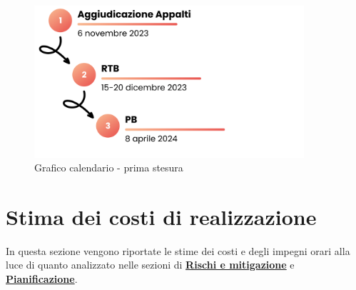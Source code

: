 \documentclass[10pt, a4paper]{article}
\begin{document}
{{{{{{ \begin{figure}[H]
        \centering
        \includegraphics[width=10cm]{Calendario di massima - prima stesura.png}
        \caption{Grafico calendario - prima stesura}
    \end{figure}

\section{Stima dei costi di realizzazione}
In questa sezione vengono riportate le stime dei costi e degli impegni orari alla luce di quanto analizzato nelle sezioni di \hyperref[section:Rischi]{\textbf{Rischi e mitigazione}} e \hyperref[section:Pianificazione]{\textbf{Pianificazione}}.

}}}}}}
\end{document}
